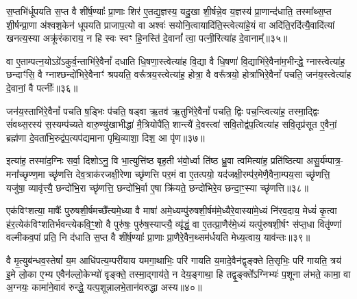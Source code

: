 {\anuvakamend[{तेनै॒व लोम॑भिः॒ समे॒ते अ॑भि॒चर॑त॒ एक॑विꣳशतिश्च॥६॥}]}

स॒प्तभि॑र्धूपयति स॒प्त वै शी॑र्\mbox{}ष॒ण्याः᳚ प्रा॒णाः शिर॑ ए॒तद्य॒ज्ञस्य॒ यदु॒खा शी॒र्\mbox{}षन्ने॒व य॒ज्ञस्य॑ प्रा॒णान्द॑धाति॒ तस्मा᳚थ्स॒प्त शी॒र्\mbox{}षन्प्रा॒णा अ॑श्वश॒केन॑ धूपयति प्राजाप॒त्यो वा अश्वः॑ सयोनि॒त्वायादि॑ति॒स्त्वेत्या॑हे॒यं वा अदि॑ति॒रदि॑त्यै॒वादि॑त्यां खनत्य॒स्या अक्रू॑रंकाराय॒ न हि स्वः स्वꣳ हि॒नस्ति॑ दे॒वानां᳚ त्वा॒ पत्नी॒रित्या॑ह दे॒वानाम्᳚॥३५॥

वा ए॒ताम्पत्न॒यो\-ऽग्रे॑\-ऽकुर्व॒न्ताभि॑रे॒वैनां᳚ दधाति धि॒षणा॒स्त्वेत्या॑ह वि॒द्या वै धि॒षणा॑ वि॒द्याभि॑रे॒वैना॑म॒भीन्द्धे॒ ग्नास्त्वेत्या॑ह॒ छन्दाꣳ॑सि॒ वै ग्नाश्छन्दो॑भिरे॒वैनाꣳ॑ श्रपयति॒ वरू᳚त्रय॒स्त्वेत्या॑ह॒ होत्रा॒ वै वरू᳚त्रयो॒ होत्रा॑भिरे॒वैनां᳚ पचति॒ जन॑य॒स्त्वेत्या॑ह दे॒वानां॒ वै पत्नीः᳚॥३६॥

जन॑य॒स्ताभि॑रे॒वैनां᳚ पचति ष॒ड्भिः प॑चति॒ षड्वा ऋ॒तव॑ ऋ॒तुभि॑रे॒वैनां᳚ पचति॒ द्विः पच॒न्त्वित्या॑ह॒ तस्मा॒द्द्विः सं॑वथ्स॒रस्य॑ स॒स्यम्प॑च्यते वारु॒ण्यु॑खाभीद्धा॑ मै॒त्रियोपै॑ति॒ शान्त्यै॑ दे॒वस्त्वा॑ सवि॒तोद्व॑प॒त्वित्या॑ह सवि॒तृप्र॑सूत ए॒वैनां॒ ब्रह्म॑णा दे॒वता॑भि॒रुद्व॑प॒त्यप॑द्यमाना पृथि॒व्याशा॒ दिश॒ आ पृ॑ण॥३७॥

इत्या॑ह॒ तस्मा॑द॒ग्निः सर्वा॒ दिशो\-ऽनु॒ वि भा॒त्युत्ति॑ष्ठ बृह॒ती भ॑वो॒र्ध्वा ति॑ष्ठ ध्रु॒वा त्वमित्या॑ह॒ प्रति॑ष्ठित्या असु॒र्य॑म्पात्र॒- मना᳚च्छृण्ण॒मा च्छृ॑णत्ति देव॒त्राक॑रजक्षी॒रेणा च्छृ॑णत्ति पर॒मं वा ए॒तत्पयो॒ यद॑जक्षी॒रम्प॑र॒मेणै॒वैना॒म्पय॒सा च्छृ॑णत्ति॒ यजु॑षा॒ व्यावृ॑त्त्यै॒ छन्दो॑भि॒रा च्छृ॑णत्ति॒ छन्दो॑भि॒र्वा ए॒षा क्रि॑यते॒ छन्दो॑भिरे॒व छन्दा॒ꣳ॒स्या च्छृ॑णत्ति॥३८॥

{\anuvakamend[{आ॒ह॒ दे॒वानां॒ वै पत्नीः᳚ पृणै॒षा षट्च॑॥७॥}]}

एक॑विꣳशत्या॒ माषैः᳚ पुरुषशी॒र्\mbox{}षमच्छै᳚त्यमे॒ध्या वै माषा॑ अमे॒ध्यम्पु॑रुषशी॒र्\mbox{}षम॑मे॒ध्यैरे॒वास्या॑मे॒ध्यं नि॑रव॒दाय॒ मेध्यं॑ कृ॒त्वा ह॑र॒त्येक॑विꣳशतिर्भवन्त्येकवि॒ꣳ॒शो वै पुरु॑षः॒ पुरु॑ष॒स्याप्त्यै॒ व्यृ॑द्धं॒ वा ए॒तत्प्रा॒णैर॑मे॒ध्यं यत्पु॑रुषशी॒र्\mbox{}षꣳ स॑प्त॒धा वितृ॑ण्णां वल्मीकव॒पां प्रति॒ नि द॑धाति स॒प्त वै शी॑र्\mbox{}ष॒ण्याः᳚ प्रा॒णाः प्रा॒णैरे॒वैन॒थ्सम॑र्धयति मेध्य॒त्वाय॒ याव॑न्तः॥३९॥

वै मृ॒त्युब॑न्धव॒स्तेषां᳚ य॒म आधि॑पत्य॒म्परी॑याय यमगा॒थाभिः॒ परि॑ गायति य॒मादे॒वैन॑द्वृङ्क्ते ति॒सृभिः॒ परि॑ गायति॒ त्रय॑ इ॒मे लो॒का ए॒भ्य ए॒वैन॑ल्लो॒केभ्यो॑ वृङ्क्ते॒ तस्मा॒द्गाय॑ते॒ न देय॒ङ्गाथा॒ हि तद्वृ॒ङ्क्ते᳚\-ऽग्निभ्यः॑ प॒शूना ल॑भते॒ कामा॒ वा अ॒ग्नयः॒ कामा॑ने॒वाव॑ रुन्द्धे॒ यत्प॒शून्नालभे॒तान॑वरुद्धा अस्य॥४०॥

